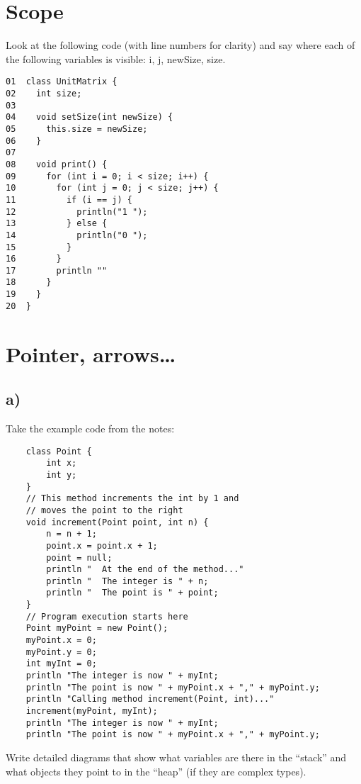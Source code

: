 \documentclass{article}
\begin{document}
\section{Scope}
\label{sec:scope}

Look at the following code  (with line numbers for clarity) and say
where each of the following  
variables is visible: i, j, newSize, size. 

\begin{verbatim}
01  class UnitMatrix {
02    int size;
03  
04    void setSize(int newSize) {
05      this.size = newSize;
06    }
07    
08    void print() {
09      for (int i = 0; i < size; i++) {
10        for (int j = 0; j < size; j++) {
11          if (i == j) {
12            println("1 ");
13          } else {
14            println("0 ");
15          }
16        }
17        println ""
18      }
19    }
20  }
\end{verbatim}

\section{Pointer, arrows\ldots}
\label{sec:pointer-arrowsldots}

\subsection{a)}

Take the example code from the notes:  

\begin{verbatim}
    class Point {
        int x;
        int y;
    }
    // This method increments the int by 1 and 
    // moves the point to the right
    void increment(Point point, int n) {
        n = n + 1;
        point.x = point.x + 1;
        point = null;
        println "  At the end of the method..."
        println "  The integer is " + n;
        println "  The point is " + point;
    }
    // Program execution starts here
    Point myPoint = new Point();
    myPoint.x = 0;
    myPoint.y = 0;
    int myInt = 0;
    println "The integer is now " + myInt;
    println "The point is now " + myPoint.x + "," + myPoint.y;
    println "Calling method increment(Point, int)..."
    increment(myPoint, myInt);
    println "The integer is now " + myInt;
    println "The point is now " + myPoint.x + "," + myPoint.y;
\end{verbatim}

Write detailed diagrams that show what variables are there in the
``stack'' and what objects they point to in the ``heap'' (if they are
complex types). 
\end{document}
